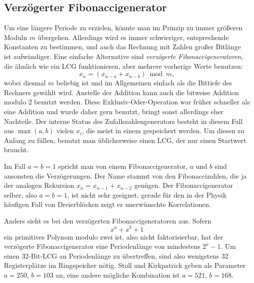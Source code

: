\subsection{Verzögerter Fibonaccigenerator}

Um eine längere Periode zu erzielen, könnte man im Prinzip zu immer
größeren Moduln $m$ übergehen. Allerdings wird es immer schwieriger,
entsprechende Konstanten zu bestimmen, und auch das Rechnung mit
Zahlen großer Bitlänge ist aufwändiger. Eine einfache Alternative
sind \emph{verzögerte Fibonaccigeneratoren}, die ähnlich wie ein LCG
funktionieren, aber mehrere vorherige Werte benutzen:
\begin{equation}
  x_n = (x_{n-a} + x_{n-b}) \bmod m,
\end{equation}
wobei diesmal $m$ beliebig ist und im Allgemeinen einfach als die
Bittiefe des Rechners gewählt wird. Anstelle der Addition kann auch
die bitweise Addition modulo 2 benutzt werden.  Diese
Exklusiv-Oder-Operation war früher schneller als eine Addition und
wurde daher gern benutzt, bringt sonst allerdings eher Nachteile.  Der
interne Status des Zufallszahlengenerators besteht in diesem Fall aus
$\max(a,b)$ vielen $x_i$, die meist in einem
\emph{} gespeichert werden.  Um diesen zu Anfang
zu füllen, benutzt man üblicherweise einen LCG, der nur einen
Startwert braucht.

Im Fall $a=b=1$ spricht man von einem Fibonaccigenerator, $a$ und $b$
sind ansonsten die Verzögerungen. Der Name stammt von den
Fibonaccizahlen, die ja der analogen Rekursion $x_n = x_{n-1} +
x_{n-2}$ genügen. Der Fibonaccigenerator selber, also $a=b=1$, ist
nicht sehr geeignet, gerade für den in der Physik häufigen Fall von
Dreierblöcken zeigt er unerwünschte Korrelationen.

Anders sieht es bei den verzögerten Fibonaccigeneratoren aus. Sofern
\begin{equation}
  x^a + x^b + 1
\end{equation}
ein primitives Polynom modulo zwei ist, also nicht faktorisierbar, hat
der verzögerte Fibonaccigenerator eine Periodenlänge von mindestens
$2^a-1$. Um einen 32-Bit-LCG an Periodenlänge zu übertreffen,
sind also wenigstens 32 Registerplätze im Ringspeicher nötig. Stoll
und Kirkpatrick geben als Parameter $a=250$, $b=103$ an, eine andere
mögliche Kombination ist $a=521$, $b=168$.

